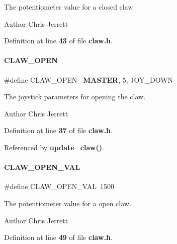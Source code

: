 The potentiometer value for a closed claw. 

\begin{DoxyAuthor}{Author}
Chris Jerrett 
\end{DoxyAuthor}


Definition at line \textbf{ 43} of file \textbf{ claw.\+h}.

\mbox{\label{a00008_ae42993ee3f6f4a0e47f99060fe736ba0}} 
\paragraph{C\+L\+A\+W\+\_\+\+O\+P\+EN}
{\footnotesize\ttfamily \#define C\+L\+A\+W\+\_\+\+O\+P\+EN~\textbf{ M\+A\+S\+T\+ER}, 5, J\+O\+Y\+\_\+\+D\+O\+WN}



The joystick parameters for opening the claw. 

\begin{DoxyAuthor}{Author}
Chris Jerrett 
\end{DoxyAuthor}


Definition at line \textbf{ 37} of file \textbf{ claw.\+h}.



Referenced by \textbf{ update\+\_\+claw()}.

\mbox{\label{a00008_a519372d8dfa1706d706053ab035ea0b9}} 
\paragraph{C\+L\+A\+W\+\_\+\+O\+P\+E\+N\+\_\+\+V\+AL}
{\footnotesize\ttfamily \#define C\+L\+A\+W\+\_\+\+O\+P\+E\+N\+\_\+\+V\+AL~1500}



The potentiometer value for a open claw. 

\begin{DoxyAuthor}{Author}
Chris Jerrett 
\end{DoxyAuthor}


Definition at line \textbf{ 49} of file \textbf{ claw.\+h}.

\mbox{\label{a00008_ae3be50b28977dac719f086e131ba8fd7}} 
